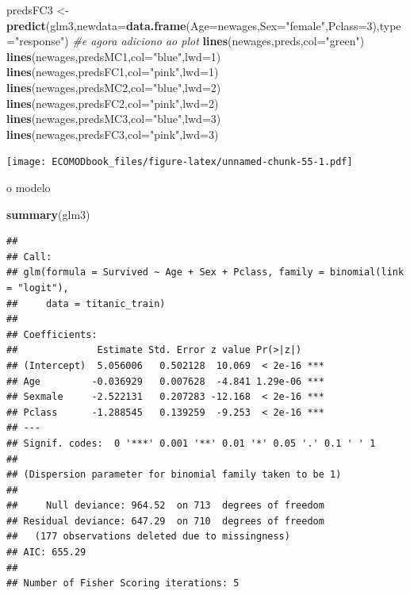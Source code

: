 \documentclass[
]{book}
\newenvironment{Shaded}{\begin{snugshade}}{\end{snugshade}}
\newcommand{\AttributeTok}[1]{\textcolor[rgb]{0.13,0.29,0.53}{#1}}
\newcommand{\CommentTok}[1]{\textcolor[rgb]{0.56,0.35,0.01}{\textit{#1}}}
\newcommand{\DecValTok}[1]{\textcolor[rgb]{0.00,0.00,0.81}{#1}}
\newcommand{\FunctionTok}[1]{\textcolor[rgb]{0.13,0.29,0.53}{\textbf{#1}}}
\newcommand{\NormalTok}[1]{#1}
\newcommand{\OtherTok}[1]{\textcolor[rgb]{0.56,0.35,0.01}{#1}}
\newcommand{\StringTok}[1]{\textcolor[rgb]{0.31,0.60,0.02}{#1}}
\begin{document}
\begin{Shaded}
\begin{Highlighting}[]
\NormalTok{predsFC3 }\OtherTok{\textless{}{-}} \FunctionTok{predict}\NormalTok{(glm3,}\AttributeTok{newdata=}\FunctionTok{data.frame}\NormalTok{(}\AttributeTok{Age=}\NormalTok{newages,}\AttributeTok{Sex=}\StringTok{"female"}\NormalTok{,}\AttributeTok{Pclass=}\DecValTok{3}\NormalTok{),}\AttributeTok{type=}\StringTok{"response"}\NormalTok{)}
\CommentTok{\#e agora adiciono ao plot}
\FunctionTok{lines}\NormalTok{(newages,preds,}\AttributeTok{col=}\StringTok{"green"}\NormalTok{)}
\FunctionTok{lines}\NormalTok{(newages,predsMC1,}\AttributeTok{col=}\StringTok{"blue"}\NormalTok{,}\AttributeTok{lwd=}\DecValTok{1}\NormalTok{)}
\FunctionTok{lines}\NormalTok{(newages,predsFC1,}\AttributeTok{col=}\StringTok{"pink"}\NormalTok{,}\AttributeTok{lwd=}\DecValTok{1}\NormalTok{)}
\FunctionTok{lines}\NormalTok{(newages,predsMC2,}\AttributeTok{col=}\StringTok{"blue"}\NormalTok{,}\AttributeTok{lwd=}\DecValTok{2}\NormalTok{)}
\FunctionTok{lines}\NormalTok{(newages,predsFC2,}\AttributeTok{col=}\StringTok{"pink"}\NormalTok{,}\AttributeTok{lwd=}\DecValTok{2}\NormalTok{)}
\FunctionTok{lines}\NormalTok{(newages,predsMC3,}\AttributeTok{col=}\StringTok{"blue"}\NormalTok{,}\AttributeTok{lwd=}\DecValTok{3}\NormalTok{)}
\FunctionTok{lines}\NormalTok{(newages,predsFC3,}\AttributeTok{col=}\StringTok{"pink"}\NormalTok{,}\AttributeTok{lwd=}\DecValTok{3}\NormalTok{)}
\end{Highlighting}
\end{Shaded}

\texttt{[image: ECOMODbook\_files/figure-latex/unnamed-chunk-55-1.pdf]}

o modelo

\begin{Shaded}
\begin{Highlighting}[]
\FunctionTok{summary}\NormalTok{(glm3)}
\end{Highlighting}
\end{Shaded}

\begin{verbatim}
## 
## Call:
## glm(formula = Survived ~ Age + Sex + Pclass, family = binomial(link = "logit"), 
##     data = titanic_train)
## 
## Coefficients:
##              Estimate Std. Error z value Pr(>|z|)    
## (Intercept)  5.056006   0.502128  10.069  < 2e-16 ***
## Age         -0.036929   0.007628  -4.841 1.29e-06 ***
## Sexmale     -2.522131   0.207283 -12.168  < 2e-16 ***
## Pclass      -1.288545   0.139259  -9.253  < 2e-16 ***
## ---
## Signif. codes:  0 '***' 0.001 '**' 0.01 '*' 0.05 '.' 0.1 ' ' 1
## 
## (Dispersion parameter for binomial family taken to be 1)
## 
##     Null deviance: 964.52  on 713  degrees of freedom
## Residual deviance: 647.29  on 710  degrees of freedom
##   (177 observations deleted due to missingness)
## AIC: 655.29
## 
## Number of Fisher Scoring iterations: 5
\end{verbatim}
\end{document}
